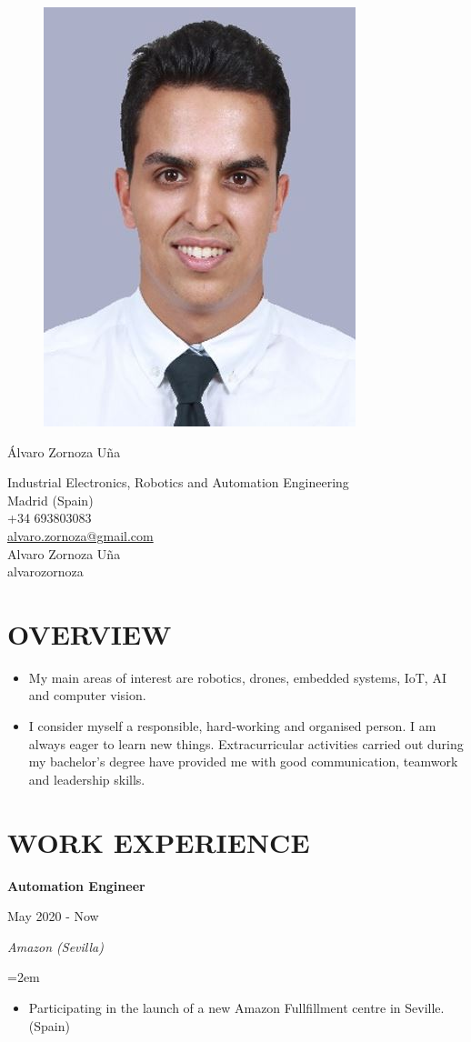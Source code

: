 \documentclass[10pt,a4paper,oneside]{book}
\newcommand{\sepspace}{\vspace*{0pt}}		%
\newcommand{\MyName}[1]{ %
		\Huge \usefont{OT1}{phv}{b}{n} \hfill #1
		\par \normalsize \normalfont}
\newcommand{\MySlogan}[1]{ %
		\large 
		\hfill #1
		\par \normalsize \normalfont}
\newcommand{\NewPart}[2]{\section*{\uppercase{#1} #2}}
\newcommand{\EducationEntrya}[4]{\noindent\ignorespaces	
		\begin{minipage}[t][][b]{0.8\textwidth} \raggedright{\textbf{#1}} \end{minipage} \hfill 
		\begin{minipage}[t][][b]{0.2\textwidth} \hfill\color{Black}#2\end{minipage} 
		 
		\noindent \textit{#3} \par        %
		\noindent\hangindent=2em\hangafter=0 \small #4 
		\normalsize \par}
\begin{document}

\begin{figure}
	\vspace*{-2em}
		\includegraphics[width=.19\textwidth]{Assets/picture.JPG}
\end{figure}

\MyName{Álvaro Zornoza Uña}
\MySlogan{\vspace{-0.15in}\begin{flushright} 
\hfill Industrial Electronics, Robotics and Automation Engineering \\ Madrid (Spain) \\ +34 693803083 \\ 
\href{mailto:alvaro.zornoza@gmail.com}{alvaro.zornoza@gmail.com} \\ \href{https://www.linkedin.com/in/alvaro-zornoza/}{ \faLinkedin} Alvaro Zornoza Uña \\ \href{https://github.com/alvarozornoza}{ \faGithub} alvarozornoza \\ 
\end{flushright}}

\vspace{0.01in}
\sepspace
 \NewPart{Overview}{}
 
 \begin{itemize}
 \item My main areas of interest are robotics, drones, embedded systems, IoT, AI and computer vision.
 \item I consider myself a responsible, hard-working and organised person. I am always eager to learn new things. Extracurricular activities carried out during my bachelor's degree have provided me with good communication, teamwork and leadership skills.
 \end{itemize}

\NewPart{Work Experience}{}

\EducationEntrya{Automation Engineer}{May 2020 - Now}{Amazon (Sevilla)}{\begin{itemize}
    \item Participating in the launch of a new Amazon Fullfillment centre in Seville. (Spain)
\end{itemize}}
\sepspace
\end{document}
